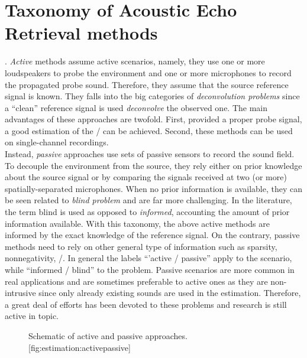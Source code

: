 \section{Taxonomy of Acoustic Echo Retrieval methods}\label{sec:estimation:taxonomy}


.
\textit{Active} methods assume active scenarios, namely, they use one or more loudspeakers to probe the environment and one or more microphones to record the propagated probe sound.
Therefore, they assume that the source reference signal is known.
They falls into the big categories of \textit{deconvolution problems} since a ``clean'' reference signal is used \textit{deconvolve} the observed one.
The main advantages of these approaches are twofold.
First, provided a proper probe signal, a good estimation of the \RIR/ can be achieved.
Second, these methods can be used on single-channel recordings.
\\Instead, \textit{passive} approaches use sets of passive sensors to record the sound field.
To decouple the environment from the source, they rely either on prior knowledge about the source signal or by comparing the signals received at two (or more) spatially-separated microphones.
When no prior information is available, they can be seen related to \textit{blind problem} and are far more challenging.
In the literature, the term blind is used as opposed to \textit{informed}, accounting the amount of prior information available.
With this taxonomy, the above active methods are informed by the exact knowledge of the reference signal.
On the contrary, passive methods need to rely on other general type of information such as sparsity, nonnegativity, \etc/.
In general the labels ``'active \vs/ passive'' apply to the scenario, while ``informed \vs/ blind'' to the problem.
Passive scenarios are more common in real applications and are sometimes preferable to active ones as they are non-intrusive since only already existing sounds are used in the estimation.
Therefore, a great deal of efforts has been devoted to these problems and research is still active in topic.

\begin{figure}[h]
    \begin{sidecaption}{%
        Schematic of active and passive approaches.
    }[fig:estimation:activepassive]
    \centering
    \resizebox{\linewidth}{!}{
        
    }
    \end{sidecaption}
\end{figure}

